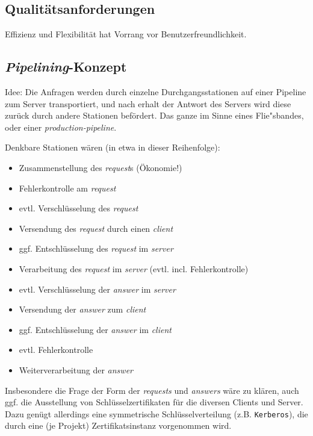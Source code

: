 \subsection{Qualit\"atsanforderungen}

Effizienz und Flexibilit\"at hat Vorrang vor Benutzerfreundlichkeit.

\subsection{\textit{Pipelining}-Konzept}

Idee: Die Anfragen werden durch einzelne Durchgangsstationen auf einer
Pipeline zum Server transportiert, und nach erhalt der Antwort des
Servers wird diese zur\"uck durch andere Stationen bef\"ordert. Das
ganze im Sinne eines Flie"sbandes, oder einer
\textit{production-pipeline}.

Denkbare Stationen w\"aren (in etwa in dieser Reihenfolge):

\begin{itemize}
\item Zusammenstellung des \textit{request}s (\"Okonomie!)
\item Fehlerkontrolle am \textit{request}
\item evtl. Verschl\"usselung des \textit{request}
\item Versendung des \textit{request} durch einen \textit{client}
\item ggf. Entschl\"usselung des \textit{request} im \textit{server}
\item Verarbeitung des \textit{request} im \textit{server} (evtl. incl.
Fehlerkontrolle)
\item evtl. Verschl\"usselung der \textit{answer} im \textit{server}
\item Versendung der \textit{answer} zum \textit{client}
\item ggf. Entschl\"usselung der \textit{answer} im \textit{client}
\item evtl. Fehlerkontrolle
\item Weiterverarbeitung der \textit{answer}

\end{itemize}

Insbesondere die Frage der Form der \textit{requests} und
\textit{answers} w\"are zu kl\"aren, auch ggf. die Ausstellung von
Schl\"usselzertifikaten f\"ur die diversen Clients und Server. Dazu
gen\"ugt allerdings eine symmetrische Schl\"usselverteilung (z.B.
\texttt{Kerberos}), die durch eine (je Projekt) Zertifikatsinstanz
vorgenommen wird.

